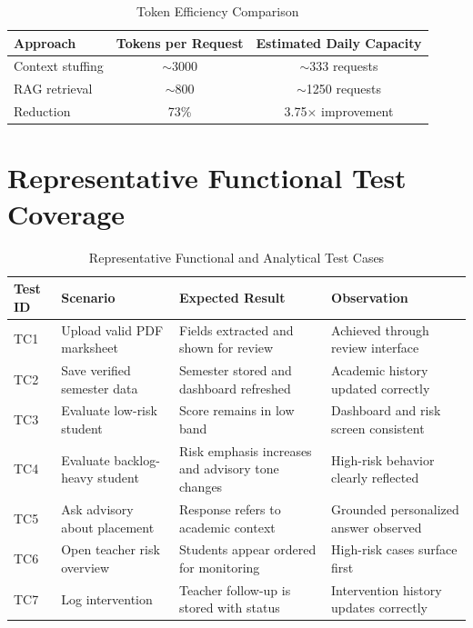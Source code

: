 \begin{table}[H]
\centering
\caption{Token Efficiency Comparison}
\begin{tabular}{lcc}
\toprule
\textbf{Approach} & \textbf{Tokens per Request} & \textbf{Estimated Daily Capacity} \\
\midrule
Context stuffing & $\sim$3000 & $\sim$333 requests \\
RAG retrieval & $\sim$800 & $\sim$1250 requests \\
Reduction & 73\% & 3.75$\times$ improvement \\
\bottomrule
\end{tabular}
\end{table}

\section{Representative Functional Test Coverage}
\begin{table}[H]
\centering
\caption{Representative Functional and Analytical Test Cases}
\begin{tabularx}{\textwidth}{>{\raggedright\arraybackslash}p{} >{\raggedright\arraybackslash}p{} >{\raggedright\arraybackslash}p{} >{\raggedright\arraybackslash}X}
\toprule
\textbf{Test ID} & \textbf{Scenario} & \textbf{Expected Result} & \textbf{Observation} \\
\midrule
TC1 & Upload valid PDF marksheet & Fields extracted and shown for review & Achieved through review interface \\
TC2 & Save verified semester data & Semester stored and dashboard refreshed & Academic history updated correctly \\
TC3 & Evaluate low-risk student & Score remains in low band & Dashboard and risk screen consistent \\
TC4 & Evaluate backlog-heavy student & Risk emphasis increases and advisory tone changes & High-risk behavior clearly reflected \\
TC5 & Ask advisory about placement & Response refers to academic context & Grounded personalized answer observed \\
TC6 & Open teacher risk overview & Students appear ordered for monitoring & High-risk cases surface first \\
TC7 & Log intervention & Teacher follow-up is stored with status & Intervention history updates correctly \\
\bottomrule
\end{tabularx}
\end{table}

